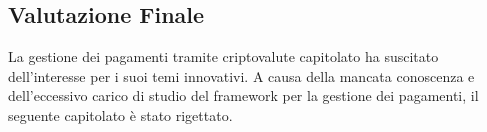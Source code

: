\subsection{Valutazione Finale}
La gestione dei pagamenti tramite criptovalute capitolato ha suscitato dell'interesse per i suoi temi innovativi. 
A causa della mancata conoscenza e dell'eccessivo carico di studio del framework per la gestione dei pagamenti, il seguente capitolato è stato rigettato. 